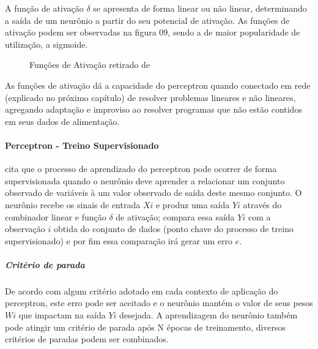 \documentclass[	12pt, Times, openright, twoside, a4paper, english, brazil]{abntex2}
\begin{document}
			     A função de ativação $\delta$ se apresenta de forma linear ou não linear, determinando a saída de um neurônio a partir do seu potencial de ativação. 
			     As funções de ativação podem ser observadas na figura 09, sendo a de maior popularidade de utilização, a sigmoide.
			
			     \begin{figure}[!ht]
    				\caption{Funções de Ativação retirado de \cite{Flavia2014} \label{fig:perceptron}}
			     \end{figure}
			
				    As funções de ativação dá a capacidade do perceptron quando conectado em rede (explicado no próximo capítulo) de resolver problemas lineares e não lineares, agregando adaptação e improviso ao resolver programas que não estão contidos em seus dados de alimentação.
			
		      \paragraph*{Perceptron - Treino Supervisionado}
            \cite{Almeida2013} cita que o processo de aprendizado do perceptron pode ocorrer de forma supervisionada quando o neurônio deve aprender a relacionar um conjunto observado de variáveis à um valor observado de saída deste mesmo conjunto. O neurônio recebe os sinais de entrada $Xi$ e produz uma saída $Yi$ através do combinador linear e função $\delta$ de ativação; compara essa saída $Yi$ com a observação $i$ obtida do conjunto de dados (ponto chave do processo de treino supervisionado) e por fim essa comparação irá gerar um erro $e$.
            
            \subparagraph* {Critério de parada}
            	De acordo com algum critério adotado em cada contexto de aplicação do perceptron, este erro pode ser aceitado e o neurônio mantém o valor de seus pesos $Wi$ que impactam na saída $Yi$ desejada. A aprendizagem do neurônio também pode atingir um critério de parada após N épocas de treinamento, diversos critérios de paradas  podem ser combinados.  
            	
\end{document}
